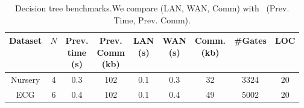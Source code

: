 \begin{table}[t]
\begin{tabular}{|c|c|c|c|c|c|c|c|c|}
\hline
Dataset  & $N$ & \thead{Prev. \\ time\\ (s)} & \thead{Prev. \\ Comm\\ (kb)} & \thead{LAN  \\ (s)} & \thead{WAN\\ (s)} & \thead{Comm. \\(kb)}& \#Gates & LOC\\
\hline
Nursery & 4 & 0.3 & 102 & 0.1 & 0.3 & 32 & 3324 & 20\\
\hline
ECG &  6 & 0.4 & 102 & 0.1 & 0.4 & 49  & 5002 & 20\\
\hline
\end{tabular}
\caption{Decision tree benchmarks.We compare \tool (LAN, WAN, Comm)
 with~\cite{wu} (Prev. Time, Prev. Comm).}
 \label{tab:dt} 
\end{table}



